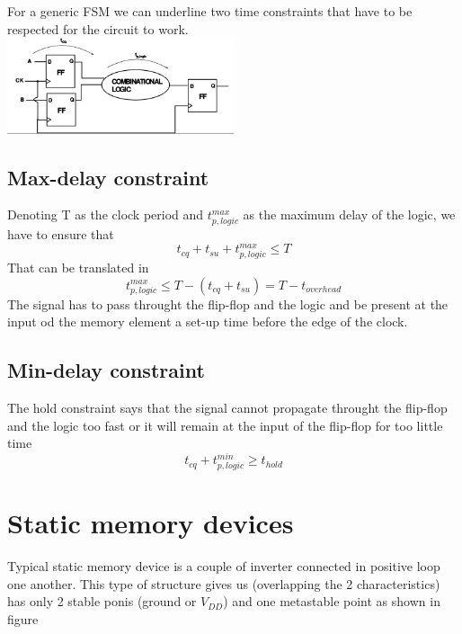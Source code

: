 For a generic FSM we can underline two time constraints that have to be respected for the circuit to work.\\

\centering
\includegraphics[width=0.5\textwidth]{C10_6.png}\\
\raggedright

\subsection{Max-delay constraint}
Denoting T as the clock period and $t_{p,logic}^{max}$ as the maximum delay of the logic, we have to ensure that 
\begin{equation}
t_{cq}+t_{su}+ t_{p,logic}^{max} \le T
\end{equation}
That can be translated in 
\begin{equation}
t_{p,logic}^{max}\le T-(t_{cq}+t_{su})=T-t_{overhead}
\end{equation}
The signal has to pass throught the flip-flop and the logic and be present at the input od the memory element a set-up time before the edge of the clock.\\

\subsection{Min-delay constraint}
The hold constraint says that the signal cannot propagate throught the flip-flop and the logic too fast or it will remain at the input of the flip-flop for too little time
\begin{equation}
t_{cq}+ t_{p,logic}^{min} \ge t_{hold}
\end{equation}


\section{Static memory devices}

Typical static memory device is a couple of inverter connected in positive loop one another. This type of structure gives us (overlapping the 2 characteristics) has only 2 stable ponis (ground or $V_{DD}$) and one metastable point as shown in figure

